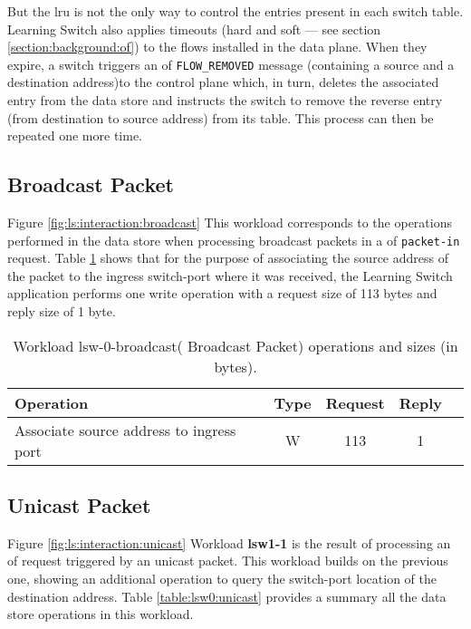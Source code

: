 But the \gls{lru} is not the only way to control the entries present
in each switch table. Learning Switch also applies timeouts (hard and
soft --- see section \ref{section:background:of})  to the flows
installed in the data plane. When they expire, a switch triggers an
\gls{of} \texttt{FLOW\_REMOVED} message (containing a source and a
destination address)to the control plane which, in
turn, deletes the associated entry from the data store and instructs
the switch to remove the reverse entry (from destination to source
address) from its table. This process can then be repeated one more
time. 

\subsection{Broadcast Packet}
Figure \ref{fig:ls:interaction:broadcast}
This workload corresponds to the operations performed in the data
store when processing broadcast packets in a \acrfull{of} 
\texttt{packet-in} request.  Table \ref{table:lsw0:broadcast} shows that for the
purpose of associating the source address of the packet to the ingress
switch-port where it was received, the Learning Switch application performs one
write operation with a request size of 113 bytes and reply size of 1
byte. 

\begin{table}[ht]
\centering 
\begin{tabular}{l c c c c}
 Operation & Type & Request & Reply \\ \toprule 
 Associate source address to ingress port & W & 113 & 1 \\ \bottomrule
\end{tabular}
\caption[Workload lsw-0-broadcast( Broadcast Packet) operations]{Workload lsw-0-broadcast( Broadcast Packet) operations and sizes (in bytes).}
\label{table:lsw0:broadcast}
\end{table}
\subsection{Unicast Packet}
Figure                \ref{fig:ls:interaction:unicast}
Workload \textbf{lsw1-1} is the result of processing an \acrfull{of} request
triggered by an unicast packet. This workload builds on the previous
one, showing an additional operation to query the switch-port location of the
destination address. Table \ref{table:lsw0:unicast} provides a summary all the data
store operations in this workload. 

